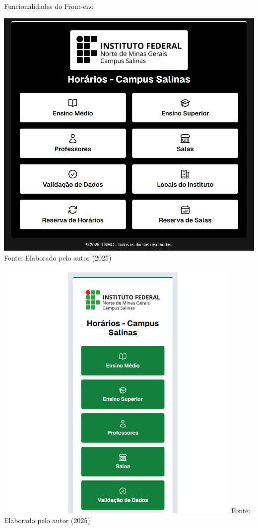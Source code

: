 \begin{frame}{Funcionalidades do Front-end}
    \begin{minipage}{0.48\textwidth}
        \centering
        \includegraphics[width=1\textwidth]{figuras/front-15.png}
        \footnotesize Fonte: Elaborado pelo autor (2025)
    \end{minipage}
    \hfill
    \begin{minipage}{0.48\textwidth}
        \centering
        \includegraphics[width=0.9\textwidth]{figuras/front-16.png}
        \footnotesize Fonte: Elaborado pelo autor (2025)
    \end{minipage}
\end{frame}

